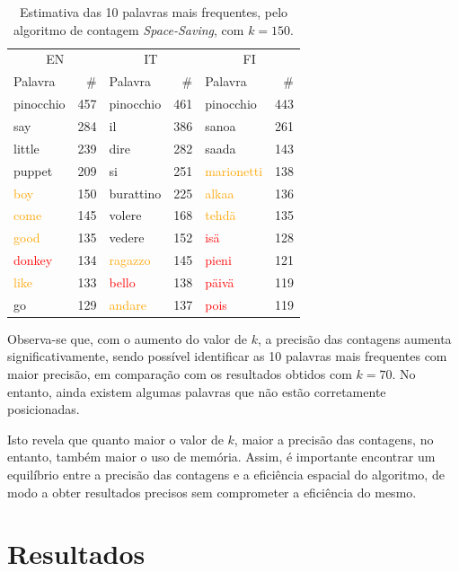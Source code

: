 \documentclass[mirror, portugues]{revdetua}
\begin{document}
\begin{table}[H]
\centering
\caption{Estimativa das 10 palavras mais frequentes, pelo algoritmo de contagem \textit{Space-Saving}, com $k = 150$.}
\label{table:top10_ss150}
\begin{tabular}{lr|lr|lr}
\toprule
\multicolumn{2}{c}{EN} & \multicolumn{2}{c}{IT} & \multicolumn{2}{c}{FI} \\
Palavra & \# & Palavra & \# & Palavra & \# \\
\midrule
pinocchio & 457 & pinocchio & 461 & pinocchio & 443 \\
say & 284 & il & 386 & sanoa & 261 \\
little & 239 & dire & 282 & saada & 143 \\
puppet & 209 & si & 251 & \textcolor{orange}{marionetti} & 138 \\
\textcolor{orange}{boy} & 150 & burattino & 225 & \textcolor{orange}{alkaa} & 136 \\
\textcolor{orange}{come} & 145 & volere & 168 & \textcolor{orange}{tehdä} & 135 \\
\textcolor{orange}{good} & 135 & vedere & 152 & \textcolor{red}{isä} & 128 \\
\textcolor{red}{donkey} & 134 & \textcolor{orange}{ragazzo} & 145 & \textcolor{red}{pieni} & 121 \\
\textcolor{orange}{like} & 133 & \textcolor{red}{bello} & 138 & \textcolor{red}{päivä} & 119 \\
go & 129 & \textcolor{orange}{andare} & 137 & \textcolor{red}{pois} & 119 \\
\bottomrule
\end{tabular}
\end{table}

Observa-se que, com o aumento do valor de $k$, a precisão das contagens aumenta significativamente, sendo possível identificar as 10 palavras mais frequentes com maior precisão, em comparação com os resultados obtidos com $k = 70$. No entanto, ainda existem algumas palavras que não estão corretamente posicionadas.

Isto revela que quanto maior o valor de $k$, maior a precisão das contagens, no entanto, também maior o uso de memória. Assim, é importante encontrar um equilíbrio entre a precisão das contagens e a eficiência espacial do algoritmo, de modo a obter resultados precisos sem comprometer a eficiência do mesmo.

\section{Resultados}
\end{document}
